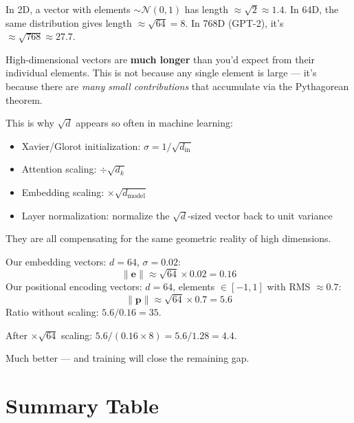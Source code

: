 \documentclass[11pt, a4paper]{article}
\begin{document}
\begin{intuition}
In 2D, a vector with elements $\sim \mathcal{N}(0, 1)$ has length $\approx \sqrt{2} \approx 1.4$.
In 64D, the same distribution gives length $\approx \sqrt{64} = 8$.
In 768D (GPT-2), it's $\approx \sqrt{768} \approx 27.7$.

\medskip
\noindent High-dimensional vectors are \textbf{much longer} than you'd expect from their individual elements.
This is not because any single element is large --- it's because there are \emph{many small contributions}
that accumulate via the Pythagorean theorem.

\medskip
\noindent This is why $\sqrt{d}$ appears so often in machine learning:
\begin{itemize}
\item Xavier/Glorot initialization: $\sigma = 1/\sqrt{d_\text{in}}$
\item Attention scaling: $\div \sqrt{d_k}$
\item Embedding scaling: $\times \sqrt{d_\text{model}}$
\item Layer normalization: normalize the $\sqrt{d}$-sized vector back to unit variance
\end{itemize}
They are all compensating for the same geometric reality of high dimensions.
\end{intuition}

\begin{application}
Our embedding vectors: $d = 64$, $\sigma = 0.02$:
\[
\|\bm{e}\| \approx \sqrt{64} \times 0.02 = 0.16
\]
Our positional encoding vectors: $d = 64$, elements $\in [-1, 1]$ with RMS $\approx 0.7$:
\[
\|\bm{p}\| \approx \sqrt{64} \times 0.7 = 5.6
\]
Ratio without scaling: $5.6 / 0.16 = 35$.

After $\times \sqrt{64}$ scaling: $5.6 / (0.16 \times 8) = 5.6 / 1.28 = 4.4$.

Much better --- and training will close the remaining gap.
\end{application}


\section{Summary Table}
\end{document}
